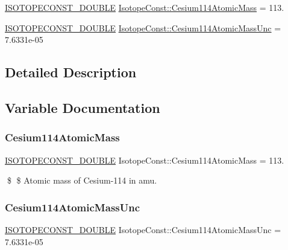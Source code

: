 \begin{DoxyCompactItemize}
\item 
\mbox{\hyperlink{group___isotope_const-_macros_ga8f45a7272ce02c0b4c65c44636ed719a}{I\+S\+O\+T\+O\+P\+E\+C\+O\+N\+S\+T\+\_\+\+D\+O\+U\+B\+LE}} \mbox{\hyperlink{group___isotope_const-_cesium-_cs114_ga03233cc4e2377edebb5d2758300191e4}{Isotope\+Const\+::\+Cesium114\+Atomic\+Mass}} = 113.
\item 
\mbox{\hyperlink{group___isotope_const-_macros_ga8f45a7272ce02c0b4c65c44636ed719a}{I\+S\+O\+T\+O\+P\+E\+C\+O\+N\+S\+T\+\_\+\+D\+O\+U\+B\+LE}} \mbox{\hyperlink{group___isotope_const-_cesium-_cs114_gabcea36e769275cfda52d08aaad14b24e}{Isotope\+Const\+::\+Cesium114\+Atomic\+Mass\+Unc}} = 7.\+6331e-\/05
\end{DoxyCompactItemize}


\subsection{Detailed Description}


\subsection{Variable Documentation}
\mbox{\label{group___isotope_const-_cesium-_cs114_ga03233cc4e2377edebb5d2758300191e4}} 
\subsubsection{\texorpdfstring{Cesium114\+Atomic\+Mass}{Cesium114AtomicMass}}
{\footnotesize\ttfamily \mbox{\hyperlink{group___isotope_const-_macros_ga8f45a7272ce02c0b4c65c44636ed719a}{I\+S\+O\+T\+O\+P\+E\+C\+O\+N\+S\+T\+\_\+\+D\+O\+U\+B\+LE}} Isotope\+Const\+::\+Cesium114\+Atomic\+Mass = 113.}

\$ \$ Atomic mass of Cesium-\/114 in amu. \mbox{\label{group___isotope_const-_cesium-_cs114_gabcea36e769275cfda52d08aaad14b24e}} 
\subsubsection{\texorpdfstring{Cesium114\+Atomic\+Mass\+Unc}{Cesium114AtomicMassUnc}}
{\footnotesize\ttfamily \mbox{\hyperlink{group___isotope_const-_macros_ga8f45a7272ce02c0b4c65c44636ed719a}{I\+S\+O\+T\+O\+P\+E\+C\+O\+N\+S\+T\+\_\+\+D\+O\+U\+B\+LE}} Isotope\+Const\+::\+Cesium114\+Atomic\+Mass\+Unc = 7.\+6331e-\/05}

